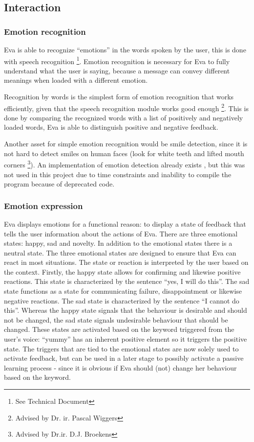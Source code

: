 \documentclass[project_eva.tex]{subfiles}
\begin{document}
\subsection*{Interaction}

\subsubsection*{Emotion recognition}
Eva is able to recognize ``emotions'' in the words spoken by the user, this is done with speech recognition \footnote{See Technical Document}. Emotion recognition is necessary for Eva to fully understand what the user is saying, because a message can convey different meanings when loaded with a different emotion.

Recognition by words is the simplest form of emotion recognition that works efficiently, given that the speech recognition module works good enough \footnote{Advised by Dr. ir. Pascal Wiggers}. This is done by comparing the recognized words with a list of positively and negatively loaded words, Eva is able to distinguish positive and negative feedback.

Another asset for simple emotion recognition would be smile detection, since it is not hard to detect smiles on human faces (look for white teeth and lifted mouth corners \footnote{Advised by Dr.ir. D.J. Broekens }). An implementation of emotion detection already exists \cite{autosmiley}, but this was not used in this project due to time 
constraints and inability to compile the program because of deprecated code.
 
\subsubsection*{Emotion expression}
\label{sec:Emotion expression}
Eva displays emotions for a functional reason: to display a state of feedback that tells the user information about the 
actions of Eva. There are three emotional states: happy, sad and novelty. In  addition to the emotional states there is a 
neutral state. The three emotional states are designed to ensure that Eva can react in most situations. The state or 
reaction is interpreted by the user based on the context. Firstly, the happy  state allows for confirming and likewise 
positive reactions. This state is characterized by the sentence ``yes, I will do this''. The sad state functions as a state 
for communicating failure, disappointment or likewise negative reactions. The sad state is characterized by the sentence 
``I cannot do this''.  Whereas the happy state signals that the behaviour is desirable and should not be changed, the sad 
state signals undesirable behaviour that should be changed. These states are activated based on the keyword triggered from 
the user’s voice: ``yummy'' has an inherent positive element so it triggers the positive state. The triggers that are tied 
to the emotional states are now solely used to activate feedback, but can be used in a later stage to possibly activate a 
passive learning process - since it is obvious if Eva should (not) change her behaviour based on the keyword.
\end{document}
